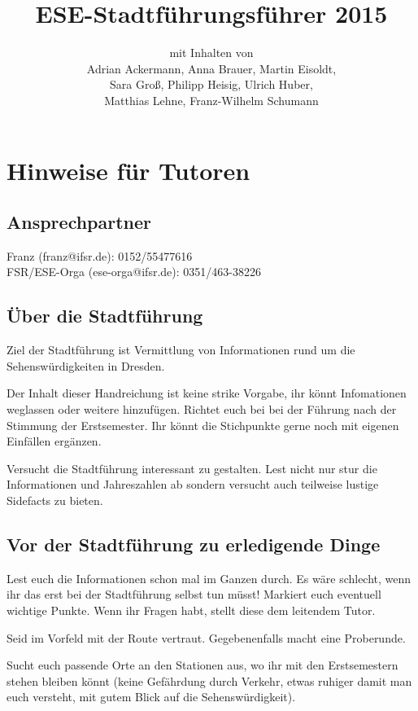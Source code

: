 \documentclass[a4paper,12pt]{report}
\begin{document}
\title{\textbf{ESE-Stadtführungsführer 2015}\\}
\date{}
\author{mit Inhalten von\\Adrian Ackermann, Anna Brauer, Martin Eisoldt,\\Sara Groß, Philipp Heisig, Ulrich Huber,\\ Matthias Lehne, Franz-Wilhelm Schumann}
\maketitle

\chapter{Hinweise für Tutoren}
\section{Ansprechpartner}
Franz (franz@ifsr.de): 0152/55477616\\
FSR/ESE-Orga (ese-orga@ifsr.de): 0351/463-38226


\section{Über die Stadtführung}
\begin{itemize*}
\item Ziel der Stadtführung ist Vermittlung von Informationen rund um die Sehenswürdigkeiten in Dresden.
\item Der Inhalt dieser Handreichung ist keine strike Vorgabe, ihr könnt Infomationen weglassen oder weitere hinzufügen.
Richtet euch bei bei der Führung nach der Stimmung der Erstsemester.
Ihr könnt die Stichpunkte gerne noch mit eigenen Einfällen ergänzen.
\item Versucht die Stadtführung interessant zu gestalten. Lest nicht nur stur die Informationen und Jahreszahlen ab sondern versucht auch teilweise lustige Sidefacts zu bieten.
\end{itemize*}

\section{Vor der Stadtführung zu erledigende Dinge}
\begin{itemize*}
\item Lest euch die Informationen schon mal im Ganzen durch.
Es wäre schlecht, wenn ihr das erst bei der Stadtführung selbst tun müsst!
Markiert euch eventuell wichtige Punkte.
Wenn ihr Fragen habt, stellt diese dem leitendem Tutor.
\item Seid im Vorfeld mit der Route vertraut. Gegebenenfalls macht eine Proberunde.
\item Sucht euch passende Orte an den Stationen aus, wo ihr mit den Erstsemestern stehen bleiben könnt (keine Gefährdung durch Verkehr, etwas ruhiger damit man euch versteht, mit gutem Blick auf die Sehenswürdigkeit).
\end{itemize*}
\end{document}
